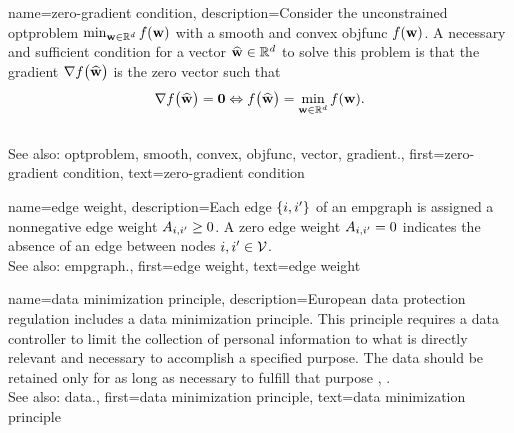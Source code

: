 {name={zero-gradient condition},
	description={Consider the unconstrained 
		\gls{optproblem} $\min_{{\bf w} \in \mathbb{R}^{d}} f({\bf w})$  with 
			a \gls{smooth} and \gls{convex} \gls{objfunc} $f({\bf w})$. A necessary and 
			sufficient condition for a \gls{vector} $\widehat{{\bf w}} \in \mathbb{R}^{d}$ 
			to solve this problem is that the \gls{gradient} $\nabla f \big( \widehat{{\bf w}} \big)$ 
			is the zero \gls{vector} such that
			$$\nabla f \big( \widehat{{\bf w}} \big) = \mathbf{0} \Leftrightarrow  f \big( \widehat{{\bf w}} \big) = \min_{{\bf w} \in \mathbb{R}^{d}} f({\bf w}).$$ 
					\\
			See also: \gls{optproblem}, \gls{smooth}, \gls{convex}, \gls{objfunc}, \gls{vector}, \gls{gradient}.}, 
		first={zero-gradient condition},
		text={zero-gradient condition}
}


{name={edge weight},
	description={Each edge $\{i,i'\}$ of an \gls{empgraph} is 
		assigned a nonnegative edge weight $A_{i,i'}\geq0$. 
		A zero edge weight $A_{i,i'}=0$ indicates the absence 
		of an edge between nodes $i, i' \in \mathcal{V}$.
				\\
		See also: \gls{empgraph}.}, 
	first={edge weight},
	text={edge weight}
}


{name={data minimization principle},
	description={European \gls{data} protection regulation 
		includes a \gls{data} minimization principle. This principle requires a \gls{data} controller to 
		limit the collection of personal information to what is directly relevant and necessary 
		to accomplish a specified purpose. The \gls{data} should be retained only for as long as 
		necessary to fulfill that purpose \cite[Article 5(1)(c)]{GDPR2016}, \cite{EURegulation2018}.
				\\
		See also: \gls{data}.}, 
	first={data minimization principle},
	text={data minimization principle}
}

